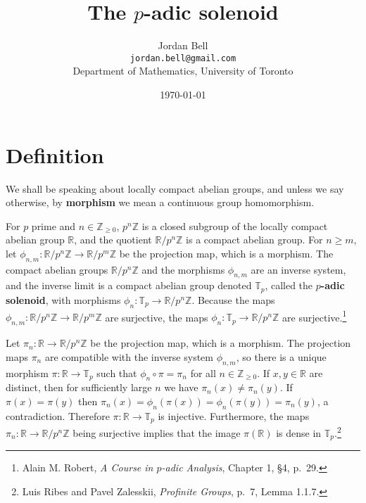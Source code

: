 \documentclass{article}
\theoremstyle{definition}
\begin{document}
\title{The $p$-adic solenoid}
\author{Jordan Bell\\ \texttt{jordan.bell@gmail.com}\\Department of Mathematics, University of Toronto}
\date{\today}

\maketitle
\section{Definition}
We shall be speaking about locally compact abelian groups, and unless we say otherwise,
by \textbf{morphism} we mean a continuous group homomorphism. 

For $p$ prime and $n \in \mathbb{Z}_{\geq 0}$, $p^n\mathbb{Z}$ is a closed subgroup of the locally compact abelian group
$\mathbb{R}$, and the quotient $\mathbb{R}/p^n \mathbb{Z}$ is a compact abelian group.
For $n \geq m$, let $\phi_{n,m}:\mathbb{R}/p^n \mathbb{Z} \to \mathbb{R}/p^m \mathbb{Z}$
be the projection map, which is a morphism. The compact abelian groups $\mathbb{R}/p^n \mathbb{Z}$ and the morphisms $\phi_{n,m}$
are an inverse system, and the inverse limit is a compact abelian group denoted $\mathbb{T}_p$, called the \textbf{$p$-adic solenoid},
with morphisms $\phi_n:\mathbb{T}_p \to \mathbb{R}/p^n \mathbb{Z}$. Because the maps $\phi_{n,m}:\mathbb{R}/p^n \mathbb{Z} \to \mathbb{R}/p^m \mathbb{Z}$
are surjective, the maps $\phi_n:\mathbb{T}_p \to \mathbb{R}/p^n\mathbb{Z}$ are surjective.\footnote{Alain M. Robert, {\em A Course in $p$-adic Analysis},
Chapter 1, \S 4, p.~29.} 

Let $\pi_n:\mathbb{R} \to \mathbb{R}/p^n\mathbb{Z}$ be the projection map, which is a  morphism. The projection maps $\pi_n$ are compatible with the inverse
system $\phi_{n,m}$, so there is a unique morphism $\pi:\mathbb{R} \to \mathbb{T}_p$ such that $\phi_n \circ \pi = \pi_n$ for all $n \in \mathbb{Z}_{\geq 0}$. 
If $x,y \in \mathbb{R}$ are distinct, then for sufficiently large $n$ we have $\pi_n(x) \neq \pi_n(y)$. If $\pi(x) = \pi(y)$ then
$\pi_n(x)=\phi_n(\pi(x))=\phi_n(\pi(y)) = \pi_n(y)$, a contradiction. Therefore $\pi:\mathbb{R} \to \mathbb{T}_p$ is injective. 
Furthermore,  the maps $\pi_n:\mathbb{R} \to \mathbb{R}/p^n \mathbb{Z}$ being surjective implies that the image $\pi(\mathbb{R})$ is dense in
$\mathbb{T}_p$.\footnote{Luis Ribes and Pavel Zalesskii, {\em Profinite Groups}, p.~7, Lemma 1.1.7.}
\end{document}
